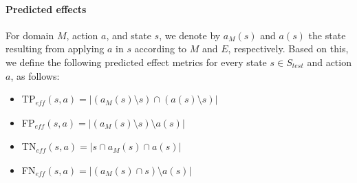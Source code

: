 \documentclass[letterpaper]{article} %
\newcommand{\eff}{\ensuremath{\textit{eff}}\xspace}
\newcommand{\stest}{\ensuremath{S_{\textit{test}}}\xspace}
\begin{document}
\paragraph{Predicted effects}
For domain $M$, action $a$, and state $s$, we denote by $a_M(s)$ and $a(s)$ the state resulting from applying $a$ in $s$ according to $M$ and $E$, respectively. 
Based on this, we define the following predicted effect metrics for every state $s\in\stest$ and action $a$, as follows: 
\begin{itemize}
    \item TP$_{\eff}(s,a)=|(a_M(s)\setminus s)\cap (a(s)\setminus s)|$
    \item FP$_{\eff}(s,a)=|(a_M(s)\setminus s)\setminus a(s)|$ 
    \item TN$_{\eff}(s,a)=|s \cap a_M(s) \cap a(s)|$
    \item FN$_{\eff}(s,a)=|(a_M(s)\cap s)\setminus a(s)|$ 
\end{itemize}
\end{document}
